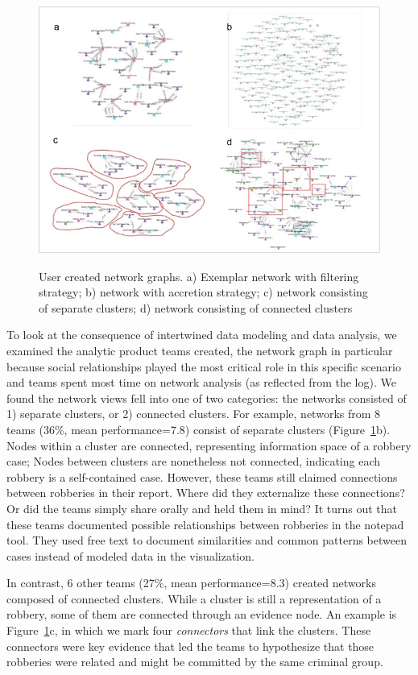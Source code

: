 \begin{figure}
\centering
\includegraphics[height=3.5in]{./img/network.jpg}
\caption{User created network graphs. a) Exemplar network with filtering
strategy; b) network with accretion strategy; c) network consisting of
separate clusters; d) network consisting of connected
clusters}\label{fig:network}
\end{figure}

To look at the consequence of intertwined data modeling and data
analysis, we examined the analytic product teams created, the network
graph in particular because social relationships played the most
critical role in this specific scenario and teams spent most time on
network analysis (as reflected from the log). We found the network views
fell into one of two categories: the networks consisted of 1) separate
clusters, or 2) connected clusters. For example, networks from 8 teams
(36\%, mean performance=7.8) consist of separate clusters (Figure~\ref{fig:network}b). Nodes within a cluster are connected,
representing information space of a robbery case; Nodes between clusters
are nonetheless not connected, indicating each robbery is a
self-contained case. However, these teams still claimed connections
between robberies in their report. Where did they externalize these
connections? Or did the teams simply share orally and held them in mind?
It turns out that these teams documented possible relationships between
robberies in the notepad tool. They used free text to document similarities and common patterns between cases instead of modeled data in the visualization.

In contrast, 6 other teams (27\%, mean performance=8.3) created networks
composed of connected clusters. While a cluster is still a
representation of a robbery, some of them are connected through an
evidence node. An example is Figure~\ref{fig:network}c, in which we
mark four \emph{connectors} that link the clusters. These connectors
were key evidence that led the teams to hypothesize that those robberies
were related and might be committed by the same criminal group.


